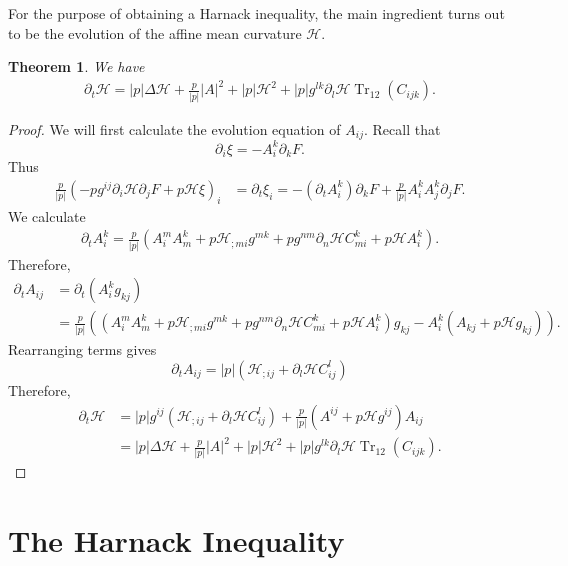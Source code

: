 \documentclass{amsart}
\newtheorem{theorem}{Theorem}
\theoremstyle{definition}
\theoremstyle{remark}
\DeclareMathOperator{\Tr}{Tr}
\numberwithin{equation}{section}
\begin{document}
For the purpose of obtaining a Harnack inequality, the main ingredient turns out to be the evolution of the affine mean curvature $\mathcal{H}$.

\begin{theorem} We have
\begin{align*}
\partial_t\mathcal{H}= |p| \Delta \mathcal{H}+\frac{p}{|p|}| A |^2+ |p|  \mathcal{H}^2+ |p|  g^{lk}\partial_l\mathcal{H} \Tr_{12}( C _{ijk}).
\end{align*}
\end{theorem}
\begin{proof}
We will first calculate the evolution equation of $ A _{ij}.$ Recall that $$\partial_i\xi=- A _i^k\partial_kF.$$ Thus
\begin{align*}
\frac{p}{|p|}\left(- p  g^{ij}\partial_i\mathcal{H}\partial_jF+ p  \mathcal{H}\xi\right)_i&=\partial_t\xi_i=-(\partial_t A _i^k)\partial_kF+\frac{p}{|p|} A _i^k A _j^k\partial_jF.
\end{align*}
We calculate
\begin{align*}
\partial_t A _i^k=\frac{p}{|p|}( A _i^m A _m^k+ p  \mathcal{H}_{;mi}g^{mk}+ p
g^{nm}\partial_n \mathcal{H} C _{mi}^k+ p  \mathcal{H} A _i^k).
\end{align*}
Therefore,
\begin{align*}
\partial_t A _{ij}&=\partial_t( A _i^kg_{kj})\\
&=\frac{p}{|p|}\left(\left( A _i^m A _m^k+ p  \mathcal{H}_{;mi}g^{mk}+ p
g^{nm}\partial_n \mathcal{H} C _{mi}^k+ p  \mathcal{H} A _i^k\right)g_{kj}- A _i^k
( A _{kj}+ p  \mathcal{H}g_{kj})\right).
\end{align*}
Rearranging terms gives
\[\partial_t  A _{ij}= |p|  (\mathcal{H}_{;ij}+  \partial_l\mathcal{H}  C _{ij}^l)\]
Therefore,
\begin{align*}
\partial_t\mathcal{H}&=|p|g^{ij}( \mathcal{H}_{;ij}+  \partial_l \mathcal{H} C ^l_{ij})+\frac{p}{|p|}( A ^{ij}+ p  \mathcal{H}g^{ij}) A _{ij}\\
&= |p| \Delta \mathcal{H}+\frac{p}{|p|}| A |^2+ |p|  \mathcal{H}^2+ |p|  g^{lk}\partial_l\mathcal{H} \Tr_{12}( C _{ijk}).
\end{align*}
\end{proof}

\section{The Harnack Inequality}
\end{document}
